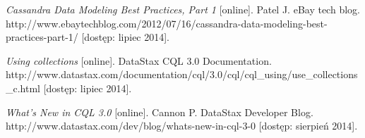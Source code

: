 \begin{thebibliography}{}
  \emph{Cassandra Data Modeling Best Practices, Part 1} [online].
  Patel J.
  eBay tech blog.
  http://www.ebaytechblog.com/2012/07/16/cassandra-data-modeling-best-practices-part-1/ [dostęp: lipiec 2014].
 
  \emph{Using collections} [online].
  DataStax CQL 3.0 Documentation.
  http://www.datastax.com/documentation/cql/3.0/cql/cql\_using/use\_collections\_c.html [dostęp: lipiec 2014].
 
  \emph{What’s New in CQL 3.0} [online].
  Cannon P.
  DataStax Developer Blog.
  http://www.datastax.com/dev/blog/whats-new-in-cql-3-0 [dostęp: sierpień 2014].
  
\end{thebibliography}
